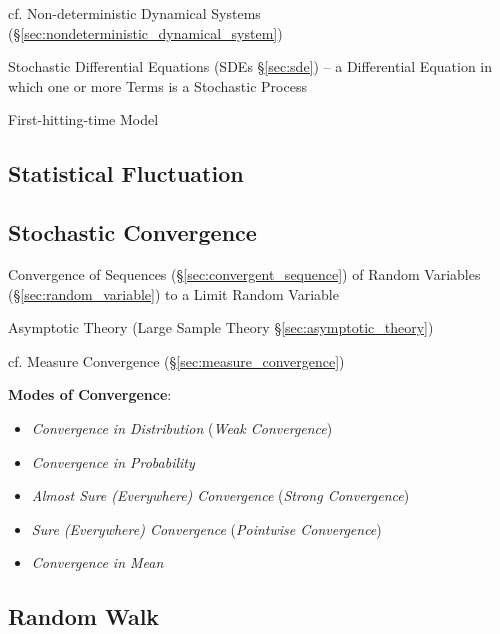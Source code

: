 \fist cf. Non-deterministic Dynamical Systems
(\S\ref{sec:nondeterministic_dynamical_system})

\fist Stochastic Differential Equations (SDEs \S\ref{sec:sde}) -- a Differential
Equation in which one or more Terms is a Stochastic Process

First-hitting-time Model



\subsection{Statistical Fluctuation}\label{sec:statistical_fluctuation}

\subsection{Stochastic Convergence}\label{sec:stochastic_convergence}

Convergence of Sequences (\S\ref{sec:convergent_sequence}) of Random Variables
(\S\ref{sec:random_variable}) to a Limit Random Variable

\fist Asymptotic Theory (Large Sample Theory \S\ref{sec:asymptotic_theory})

\fist cf. Measure Convergence (\S\ref{sec:measure_convergence})

\textbf{Modes of Convergence}:
\begin{itemize}
  \item \emph{Convergence in Distribution} (\emph{Weak Convergence})
  \item \emph{Convergence in Probability}
  \item \emph{Almost Sure (Everywhere) Convergence} (\emph{Strong Convergence})
  \item \emph{Sure (Everywhere) Convergence} (\emph{Pointwise Convergence})
  \item \emph{Convergence in Mean}
\end{itemize}



\subsection{Random Walk}\label{sec:random_walk}

